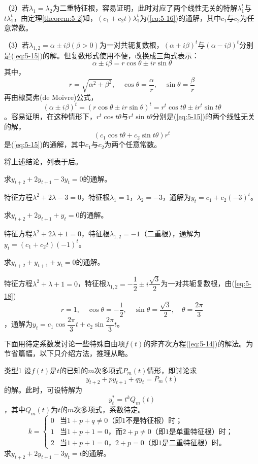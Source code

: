 		（2）若$\lambda _1 = \lambda _2$为二重特征根，容易证明，此时对应了两个线性无关的特解$\lambda ^t_1$与$t\lambda ^t_1$，由定理\ref{theorem:5-2}知，$(c_1 + c_2t) \lambda ^t_1$为(\ref{eq:5-16})的通解，其中$c_1$与$c_2$为任意常数。

		（3）若$\lambda _{1,2} = \alpha \pm i\beta(\beta > 0)$为一对共轭复数根，$(\alpha + i\beta)^t$与$(\alpha - i\beta)^t$分别是(\ref{eq:5-15})的解。但复数形式使用不便，改换成三角式表示：
		\begin{equation}\label{eq:5-18}
			\alpha \pm i\beta = r \cos \theta \pm ir \sin \theta
		\end{equation}
		其中，
		\begin{equation}\label{eq:5-19}
			r = \sqrt{\alpha ^ 2 + \beta ^ 2}, \quad \cos \theta = \dfrac{\alpha}{r}, \quad \sin \theta = \dfrac{\beta}{r}
		\end{equation}
		再由棣莫弗(de Moivre)公式，$$(\alpha \pm i\beta) ^ t = (r \cos \theta \pm ir \sin \theta) ^t = r^t \cos t \theta \pm ir^t \sin t\theta$$。容易证明，在这种情形下，$r^t \cos t \theta$与$r^t \sin t \theta$分别是(\ref{eq:5-15})的两个线性无关的解，$$(c_1 \cos t\theta + c_2 \sin t\theta)r^t$$是(\ref{eq:5-15})的通解，其中$c_1$与$c_2$为两个任意常数。

		将上述结论，列表于后。

		\example 求$y_{t+2} + 2y_{t+1} - 3y_t = 0$的通解。

		\answer 特征方程$\lambda ^2 + 2\lambda - 3 = 0$，特征根$\lambda _1 = 1$，$\lambda _2 = -3$，通解为$y_t = c_1 + c_2(-3)^t$。

		\example 求$y_{t+2} + 2y_{t+1} + y_t = 0$的通解。

		\answer 特征方程$\lambda ^2 + 2\lambda + 1 =0$，特征根$\lambda _{1,2} = -1$（二重根），通解为$y_t = (c_1 + c_2 t)(-1)^t$。

		\example 求$y_{t+2} + y_{t+1} + y_t = 0$的通解。

		\answer 特征方程$\lambda ^2 + \lambda + 1 = 0$，特征根$\lambda _{1,2} = -\dfrac{1}{2} \pm i \dfrac{\sqrt{3}}{2}$为一对共轭复数根，由(\ref{eq:5-18})$$r=1, \quad \cos \theta = -\frac{1}{2}, \quad \sin \theta = \frac{\sqrt{3}}{2}, \quad \theta = \frac{2 \pi}{3}$$，通解为$y_t = c_1 \cos \dfrac{2\pi}{3}t + c_2 \sin \dfrac{2\pi}{3}t$。

		下面用待定系数发讨论一些特殊自由项$f(t)$的非齐次方程(\ref{eq:5-14})的解法。为节省篇幅，以下只介绍方法，推理从略。

		{\heiti 类型1} \quad 设$f(t)$是$t$的已知的$m$次多项式$P_m(t)$情形，即讨论求$$y_{t+2} + py_{t+1} + qy_t = P_m(t)$$的解。此时，可设特解为$$y^*_t = t^k Q_m(t)$$，其中$Q_m(t)$为$t$的$m$次多项式，系数待定。
		\begin{displaymath}
			k = 
			\begin{cases}
				0 & \text{当$1 + p + q \neq 0$（即$1$不是特征根）时；} \\
				1 & \text{当$1 + p + 1 = 0$，而$2 + p \neq 0$（即$1$是单重特征根）时；} \\
				2 & \text{当$1 + p + 1 = 0$，$2 + p = 0$（即$1$是二重特征根）时。}
			\end{cases}
		\end{displaymath}
		\example 求$y_{t+2} + 2y_{t+1} - 3y_t = t$的通解。


